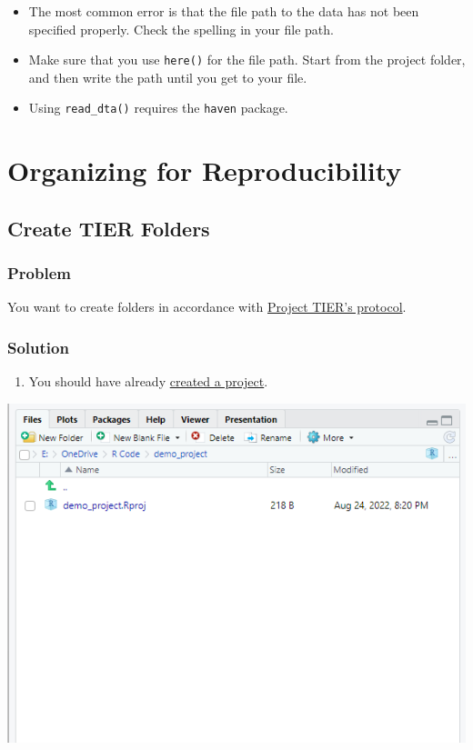 \documentclass[
]{book}
\providecommand{\tightlist}{%
  \setlength{\itemsep}{0pt}\setlength{\parskip}{0pt}}
\begin{document}
\begin{itemize}
\tightlist
\item
  The most common error is that the file path to the data has not been specified properly. Check the spelling in your file path.
\item
  Make sure that you use \texttt{here()} for the file path. Start from the project folder, and then write the path until you get to your file.
\item
  Using \texttt{read\_dta()} requires the \texttt{haven} package.
\end{itemize}

\hypertarget{organizing-for-reproducibility}{%
\chapter{Organizing for Reproducibility}\label{organizing-for-reproducibility}}

\hypertarget{tiercreate}{%
\section{Create TIER Folders}\label{tiercreate}}

\hypertarget{problem-11}{%
\subsection{Problem}\label{problem-11}}

You want to create folders in accordance with \href{https://www.projecttier.org/tier-protocol/protocol-4-0/}{Project TIER's protocol}.

\hypertarget{solution-11}{%
\subsection{Solution}\label{solution-11}}

\begin{enumerate}
\def\labelenumi{\arabic{enumi}.}
\tightlist
\item
  You should have already \protect\hyperlink{project}{created a project}.
\end{enumerate}

\includegraphics{images/projdirectory2.png}
\end{document}
